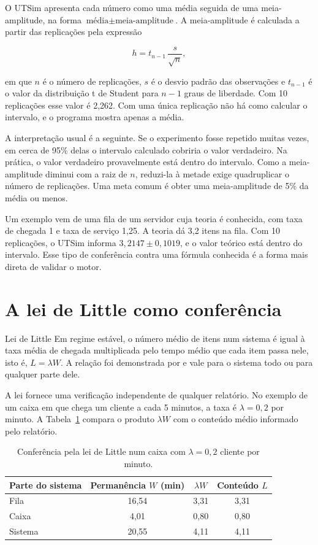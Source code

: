 O UTSim apresenta cada número como uma média seguida de uma meia-amplitude, na forma $\text{média} \pm \text{meia-amplitude}$. A meia-amplitude é calculada a partir das replicações pela expressão

\begin{equation}
h = t_{n-1}\,\frac{s}{\sqrt{n}},
\end{equation}

em que $n$ é o número de replicações, $s$ é o desvio padrão das observações e $t_{n-1}$ é o valor da distribuição t de Student para $n-1$ graus de liberdade. Com 10 replicações esse valor é 2,262. Com uma única replicação não há como calcular o intervalo, e o programa mostra apenas a média.

A interpretação usual é a seguinte. Se o experimento fosse repetido muitas vezes, em cerca de 95\% delas o intervalo calculado cobriria o valor verdadeiro. Na prática, o valor verdadeiro provavelmente está dentro do intervalo. Como a meia-amplitude diminui com a raiz de $n$, reduzi-la à metade exige quadruplicar o número de replicações. Uma meta comum é obter uma meia-amplitude de 5\% da média ou menos.

Um exemplo vem de uma fila de um servidor cuja teoria é conhecida, com taxa de chegada 1 e taxa de serviço 1,25. A teoria dá 3,2 itens na fila. Com 10 replicações, o UTSim informa $3{,}2147 \pm 0{,}1019$, e o valor teórico está dentro do intervalo. Esse tipo de conferência contra uma fórmula conhecida é a forma mais direta de validar o motor.

\section{A lei de Little como conferência}

\begin{definicao}{Lei de Little}
Em regime estável, o número médio de itens num sistema é igual à taxa média de chegada multiplicada pelo tempo médio que cada item passa nele, isto é, $L = \lambda W$. A relação foi demonstrada por \textcite{little1961} e vale para o sistema todo ou para qualquer parte dele.
\end{definicao}

A lei fornece uma verificação independente de qualquer relatório. No exemplo de um caixa em que chega um cliente a cada 5 minutos, a taxa é $\lambda = 0{,}2$ por minuto. A Tabela~\ref{tab-little} compara o produto $\lambda W$ com o conteúdo médio informado pelo relatório.

\begin{table}[ht]
\centering
\caption{Conferência pela lei de Little num caixa com $\lambda = 0{,}2$ cliente por minuto.}
\label{tab-little}
\begin{tabular}{@{}lccc@{}}
\toprule
\textbf{Parte do sistema} & \textbf{Permanência $W$ (min)} & \textbf{$\lambda W$} & \textbf{Conteúdo $L$} \\
\midrule
Fila    & 16,54 & 3,31 & 3,31 \\
Caixa   & 4,01  & 0,80 & 0,80 \\
Sistema & 20,55 & 4,11 & 4,11 \\
\bottomrule
\end{tabular}
\end{table}

